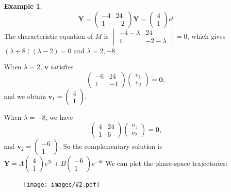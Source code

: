\documentclass[a4paper]{article}
\theoremstyle{definition}
\newtheorem*{eg}{Example}
\newcommand{\mb}[1]{\mathbf{#1}}
\newcommand{\img}[2][]{\begin{figure}[ht]\centering\texttt{[image: images/\#2.pdf]}\end{figure}}
\begin{document}
\begin{eg}
  \[
  \mb{\dot{Y}} = 
  \begin{pmatrix}
    -4 & 24\\
    1 & -2
  \end{pmatrix}
  \mb{Y} = 
  \begin{pmatrix}
    4\\1
  \end{pmatrix}e^t
  \]
  The characteristic equation of $M$ is $
  \begin{vmatrix}
    -4 - \lambda & 24\\
    1 & -2 - \lambda
  \end{vmatrix} = 0$, which gives $(\lambda + 8)(\lambda - 2) = 0$ and $\lambda = 2, -8$.

  When $\lambda = 2$, $\mb{v}$ satisfies
  \[
  \begin{pmatrix}
    -6 & 24\\
    1 & -4
  \end{pmatrix}
  \begin{pmatrix}
    v_1\\v_2
  \end{pmatrix} = \mb{0},
  \]
  and we obtain $\mb{v}_1 = 
  \begin{pmatrix}
    4\\1
  \end{pmatrix}$.

  When $\lambda = -8$, we have
  \[
  \begin{pmatrix}
    4 & 24\\
    1 & 6
  \end{pmatrix}
  \begin{pmatrix}
    v_1\\v_2
  \end{pmatrix} = \mb{0},
  \]
  and $\mb{v}_2 = 
  \begin{pmatrix}
    -6 \\1
  \end{pmatrix}$. So the complementary solution is 
  $\mb{Y} = A
  \begin{pmatrix}
    4\\1
  \end{pmatrix}e^{2t} + B
  \begin{pmatrix}
    -6\\1
  \end{pmatrix}e^{-8t}$
We can plot the phase-space trajectories:

\img{de_24}


\end{eg}
\end{document}
